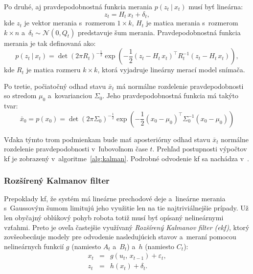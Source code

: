       Po druhé, aj pravdepodobnostná funkcia merania $p(z_t\ |\ x_t)$ musí byť lineárna:
      \begin{equation}
        z_t = H_t\, x_t + \delta_t,
      \end{equation}
      kde $z_t$ je vektor merania s~rozmerom $1\times k$, $H_t$ je matica merania s~rozmerom $k\times n$ a~$\delta_t \sim \mathcal{N}(0,Q_t)$ predstavuje šum merania. Pravdepodobnostná funkcia merania je tak definovaná ako:
      \begin{equation}
        p (z_t\ |\ x_t) = \det{(2\pi{} R_t)}^{-\frac{1}{2}} \exp{\left( -\frac{1}{2} {(z_t - H_t\, x_t)}^{\top} R_t^{-1} (z_t - H_t\, x_t) \right)},
      \end{equation}
      kde $R_t$ je matica rozmeru $k\times k$, ktorá vyjadruje lineárny merací model snímača.

      Po tretie, počiatočný odhad stavu $\bar{x}_t$ má normálne rozdelenie pravdepodobnosti so stredom $\mu_0$ a~kovarianciou $\Sigma_0$. Jeho pravdepodobnostná funkcia má takýto tvar:
      \begin{equation}
        \bar{x}_0 = p (x_0) = \det{(2\pi{} \Sigma_0)}^{-\frac{1}{2}} \exp{\left( -\frac{1}{2} {(x_0 - \mu_0)}^{\top} \Sigma_0^{-1} (x_0 - \mu_0) \right)}
      \end{equation}

      Vďaka týmto trom podmienkam bude mať aposteriórny odhad stavu $\bar{x}_t$ normálne rozdelenie pravdepodobnosti v~ľubovoľnom čase $t$. Prehľad postupnosti výpočtov \acrshort{kf} je zobrazený v~algoritme~\ref{alg:kalman}. Podrobné odvodenie \acrshort{kf} sa nachádza v~\cite[kap. 3.2.4]{thrunProbabilisticRobotics2005}.

    \subsubsection{Rozšírený Kalmanov filter}

      Prepoklady \acrshort{kf}, že systém má lineárne prechodové deje a~lineárne merania s~Gaussovým šumom limitujú jeho využitie len na tie najtriviálnejšie prípady. Už len obyčajný oblúkový pohyb robota totiž musí byť opísaný nelineárnymi vzťahmi. Preto je oveľa častejšie využívaný \emph{Rozšírený Kalmanov filter (\acrshort{ekf})}, ktorý zovšeobecňuje modely pre odvodenie nasledujúcich stavov a~meraní pomocou nelineárnych funkcií $g$ (namiesto $A_t$ a~$B_t$) a~$h$ (namiesto $C_t$):
      \begin{eqnarray}
        x_t &=& g(u_t,\, x_{t-1}) + \varepsilon_t, \\
        z_t &=& h(x_t) + \delta_t.
      \end{eqnarray}

